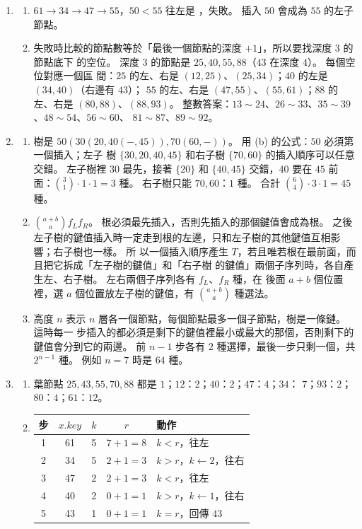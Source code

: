 \begin{enumerate}
\item
\begin{enumerate}
\item $61 \to 34 \to 47 \to 55$，$50 < 55$ 往左是 \NIL，失敗。 插入 $50$ 會成為 $55$
的左子節點。
\item 失敗時比較的節點數等於「最後一個節點的深度 $+ 1$」，所以要找深度 $3$ 的節點底下
的空位。 深度 $3$ 的節點是 $25, 40, 55, 88$（$43$ 在深度 $4$）。 每個空位對應一個區
間：$25$ 的左、右是 $(12, 25)$、$(25, 34)$；$40$ 的左是 $(34, 40)$（右邊有 $43$）；
$55$ 的左、右是 $(47, 55)$、$(55, 61)$；$88$ 的左、右是 $(80, 88)$、$(88, 93)$。
整數答案：$13 \sim 24$、$26 \sim 33$、$35 \sim 39$、$48 \sim 54$、$56 \sim 60$、
$81 \sim 87$、$89 \sim 92$。
\end{enumerate}

\item
\begin{enumerate}
\item 樹是 $50(30(20,40(-,45)),70(60,-))$。 用 (b) 的公式：$50$ 必須第一個插入；左子
樹 $\{30, 20, 40, 45\}$ 和右子樹 $\{70, 60\}$ 的插入順序可以任意交錯。 左子樹裡 $30$
最先，接著 $\{20\}$ 和 $\{40, 45\}$ 交錯，$40$ 要在 $45$ 前面：$\binom{3}{1} \cdot 1
\cdot 1 = 3$ 種。 右子樹只能 $70, 60$：$1$ 種。 合計 $\binom{6}{4} \cdot 3 \cdot 1 =
45$ 種。
\item $\binom{a+b}{a} f_L f_R$。 根必須最先插入，否則先插入的那個鍵值會成為根。 之後
左子樹的鍵值插入時一定走到根的左邊，只和左子樹的其他鍵值互相影響；右子樹也一樣。 所
以一個插入順序產生 $T$，若且唯若根在最前面，而且把它拆成「左子樹的鍵值」和「右子樹
的鍵值」兩個子序列時，各自產生左、右子樹。 左右兩個子序列各有 $f_L$、$f_R$ 種，在
後面 $a + b$ 個位置裡，選 $a$ 個位置放左子樹的鍵值，有 $\binom{a+b}{a}$ 種選法。
\item 高度 $n$ 表示 $n$ 層各一個節點，每個節點最多一個子節點，樹是一條鏈。 這時每一
步插入的都必須是剩下的鍵值裡最小或最大的那個，否則剩下的鍵值會分到它的兩邊。 前
$n - 1$ 步各有 $2$ 種選擇，最後一步只剩一個，共 $2^{n-1}$ 種。 例如 $n = 7$ 時是 $64$ 種。
\end{enumerate}

\item
\begin{enumerate}
\item 葉節點 $25,\allowbreak 43,\allowbreak 55,\allowbreak 70,\allowbreak 88$ 都是 $1$；$12$：$2$；$40$：$2$；$47$：$4$；$34$：
$7$；$93$：$2$；$80$：$4$；$61$：$12$。
\item
\begin{tabular}[t]{ccccl}
\toprule
步 & $x.\mathit{key}$ & $k$ & $r$ & 動作 \\
\midrule
1 & 61 & 5 & $7 + 1 = 8$ & $k < r$，往左 \\
2 & 34 & 5 & $2 + 1 = 3$ & $k > r$，$k \gets 2$，往右 \\
3 & 47 & 2 & $2 + 1 = 3$ & $k < r$，往左 \\
4 & 40 & 2 & $0 + 1 = 1$ & $k > r$，$k \gets 1$，往右 \\
5 & 43 & 1 & $0 + 1 = 1$ & $k = r$，回傳 $43$ \\
\bottomrule
\end{tabular}


\end{enumerate}
\end{enumerate}
